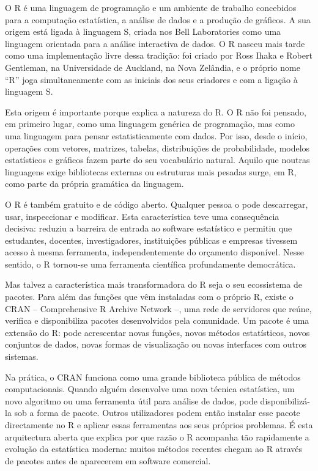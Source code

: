 \documentclass[
  portuguese,
  11pt,
  openany]{book}
\begin{document}
O R é uma linguagem de programação e um ambiente de trabalho concebidos para a computação estatística, a análise de dados e a produção de gráficos. A sua origem está ligada à linguagem S, criada nos Bell Laboratories como uma linguagem orientada para a análise interactiva de dados. O R nasceu mais tarde como uma implementação livre dessa tradição: foi criado por Ross Ihaka e Robert Gentleman, na Universidade de Auckland, na Nova Zelândia, e o próprio nome ``R'' joga simultaneamente com as iniciais dos seus criadores e com a ligação à linguagem S.

Esta origem é importante porque explica a natureza do R. O R não foi pensado, em primeiro lugar, como uma linguagem genérica de programação, mas como uma linguagem para pensar estatisticamente com dados. Por isso, desde o início, operações com vetores, matrizes, tabelas, distribuições de probabilidade, modelos estatísticos e gráficos fazem parte do seu vocabulário natural. Aquilo que noutras linguagens exige bibliotecas externas ou estruturas mais pesadas surge, em R, como parte da própria gramática da linguagem.

O R é também gratuito e de código aberto. Qualquer pessoa o pode descarregar, usar, inspeccionar e modificar. Esta característica teve uma consequência decisiva: reduziu a barreira de entrada ao software estatístico e permitiu que estudantes, docentes, investigadores, instituições públicas e empresas tivessem acesso à mesma ferramenta, independentemente do orçamento disponível. Nesse sentido, o R tornou-se uma ferramenta científica profundamente democrática.

Mas talvez a característica mais transformadora do R seja o seu ecossistema de pacotes. Para além das funções que vêm instaladas com o próprio R, existe o CRAN -- Comprehensive R Archive Network --, uma rede de servidores que reúne, verifica e disponibiliza pacotes desenvolvidos pela comunidade. Um pacote é uma extensão do R: pode acrescentar novas funções, novos métodos estatísticos, novos conjuntos de dados, novas formas de visualização ou novas interfaces com outros sistemas.

Na prática, o CRAN funciona como uma grande biblioteca pública de métodos computacionais. Quando alguém desenvolve uma nova técnica estatística, um novo algoritmo ou uma ferramenta útil para análise de dados, pode disponibilizá-la sob a forma de pacote. Outros utilizadores podem então instalar esse pacote directamente no R e aplicar essas ferramentas aos seus próprios problemas. É esta arquitectura aberta que explica por que razão o R acompanha tão rapidamente a evolução da estatística moderna: muitos métodos recentes chegam ao R através de pacotes antes de aparecerem em software comercial.
\end{document}
